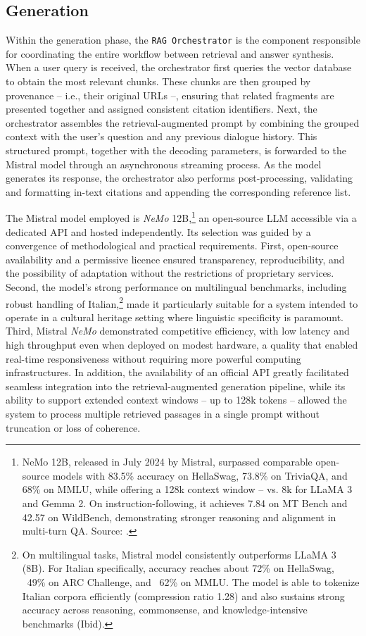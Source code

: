 \begin{spacing}{1.5}
\section{Generation}\label{sec:rag_generation}
Within the generation phase, the \texttt{RAG Orchestrator} is the component responsible for coordinating the entire workflow between retrieval and answer synthesis. When a user query is received, the orchestrator first queries the vector database to obtain the most relevant chunks. These chunks are then grouped by provenance -- i.e., their original URLs --, ensuring that related fragments are presented together and assigned consistent citation identifiers. Next, the orchestrator assembles the retrieval-augmented prompt by combining the grouped context with the user’s question and any previous dialogue history. This structured prompt, together with the decoding parameters, is forwarded to the Mistral model through an asynchronous streaming process. As the model generates its response, the orchestrator also performs post-processing, validating and formatting in-text citations and appending the corresponding reference list.

The Mistral model employed is \textit{NeMo} 12B,\footnote{NeMo 12B, released in July 2024 by Mistral, surpassed comparable open-source models with 83.5\% accuracy on HellaSwag, 73.8\% on TriviaQA, and 68\% on MMLU, while offering a 128k context window -- vs. 8k for LLaMA 3 and Gemma 2. On instruction-following, it achieves 7.84 on MT Bench and 42.57 on WildBench, demonstrating stronger reasoning and alignment in multi-turn QA. Source: \cite{noauthor_mistral_2025}.} an open-source LLM accessible via a dedicated API and hosted independently. Its selection was guided by a convergence of methodological and practical requirements. First, open-source availability and a permissive licence ensured transparency, reproducibility, and the possibility of adaptation without the restrictions of proprietary services. Second, the model’s strong performance on multilingual benchmarks, including robust handling of Italian,\footnote{On multilingual tasks, Mistral model consistently outperforms LLaMA 3 (8B). For Italian specifically, accuracy reaches about 72\% on HellaSwag, ~49\% on ARC Challenge, and ~62\% on MMLU. The model is able to tokenize Italian corpora efficiently (compression ratio 1.28) and also sustains strong accuracy across reasoning, commonsense, and knowledge-intensive benchmarks (Ibid).} made it particularly suitable for a system intended to operate in a cultural heritage setting where linguistic specificity is paramount. Third, Mistral \textit{NeMo} demonstrated competitive efficiency, with low latency and high throughput even when deployed on modest hardware, a quality that enabled real-time responsiveness without requiring more powerful computing infrastructures. In addition, the availability of an official API greatly facilitated seamless integration into the retrieval-augmented generation pipeline, while its ability to support extended context windows -- up to 128k tokens -- allowed the system to process multiple retrieved passages in a single prompt without truncation or loss of coherence.


\end{spacing}
